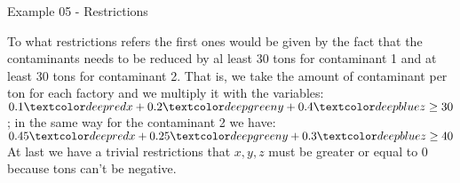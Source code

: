 \begin{frame}{Example 05 - Restrictions}

To what restrictions refers the first ones would be given by the fact that the
contaminants needs to be reduced by al least 30 tons for contaminant 1 and
at least 30 tons for contaminant 2. That is, we take the amount of contaminant
per ton for each factory and we multiply it with the variables:
$0.1 \colora{x} + 0.2 \colorb{y} + 0.4\colorc{z} \ge 30$; in the same way for
the contaminant 2 we have:
$0.45\colora{x} + 0.25\colorb{y} + 0.3\colorc{z} \ge 40$ At last we have a
trivial restrictions that $x, y, z$ must be greater or equal to 0 because
tons can't be negative.

\end{frame}
